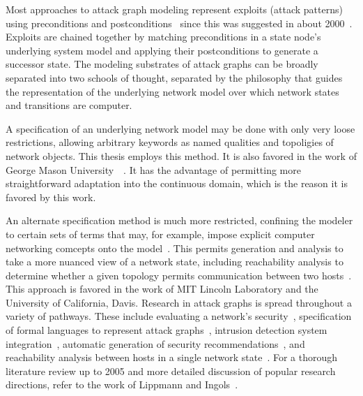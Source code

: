 Most approaches to attack graph modeling represent exploits (attack patterns) using
preconditions and postconditions~\cite{lippmann2005annotated} since this was suggested in about 2000~\cite{templeton2001requires}. Exploits are chained together by matching preconditions in a state node's
underlying system model and applying their postconditions to generate a successor state.
The modeling substrates of attack graphs can be broadly separated into two schools of
thought, separated by the philosophy that guides the representation of the underlying
network model over which network states and transitions are computer.

A specification of an underlying network model may be done with only very loose
restrictions, allowing arbitrary keywords as named qualities and topoligies of network objects.
This thesis employs this method. It is also favored in the work of George Mason 
University~\cite{ammann2002scalable}~\cite{wang2006minimum}. It has the advantage of
permitting more straightforward adaptation into the continuous domain, which is the reason
it is favored by this work. 

An alternate specification method is much more restricted, confining the modeler to
certain sets of terms that may, for example, impose explicit computer networking 
comcepts onto the model~\cite{templeton2001requires}.
This permits generation and analysis to take a
more nuanced view of a network state, including reachability analysis to determine whether a
given topology permits communication between two hosts~\cite{ingols2009modeling}. This approach
is favored in the work of MIT Lincoln Laboratory and the University of California, Davis.
Research in attack graphs is spread throughout a variety of pathways. These include
evaluating a network's security~\cite{ammann2002scalable}, specification of formal languages
to represent attack graphs~\cite{templeton2001requires}, intrusion detection system 
integration~\cite{tidwell2001modeling}, automatic generation of security recommendations~\cite{wang2006minimum},
and reachability analysis between hosts in a single network state~\cite{ingols2009modeling}. 
For a thorough literature review up to 2005 and more detailed discussion of popular research directions, 
refer to the work of Lippmann and Ingols~\cite{lippmann2005annotated}.

